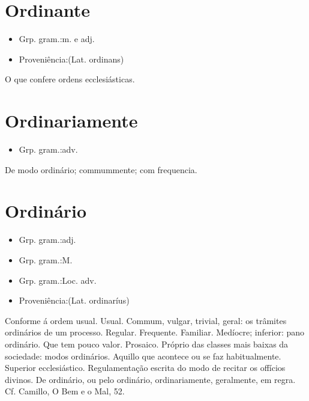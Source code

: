 \section{Ordinante}
\begin{itemize}
\item {Grp. gram.:m.  e  adj.}
\end{itemize}
\begin{itemize}
\item {Proveniência:(Lat. \textunderscore ordinans\textunderscore )}
\end{itemize}
O que confere ordens ecclesiásticas.
\section{Ordinariamente}
\begin{itemize}
\item {Grp. gram.:adv.}
\end{itemize}
De modo ordinário; commummente; com frequencia.
\section{Ordinário}
\begin{itemize}
\item {Grp. gram.:adj.}
\end{itemize}
\begin{itemize}
\item {Grp. gram.:M.}
\end{itemize}
\begin{itemize}
\item {Grp. gram.:Loc. adv.}
\end{itemize}
\begin{itemize}
\item {Proveniência:(Lat. \textunderscore ordinaríus\textunderscore )}
\end{itemize}
Conforme á ordem usual.
Usual.
Commum, vulgar, trivial, geral: \textunderscore os trâmites ordinários de um processo\textunderscore .
Regular.
Frequente.
Familiar.
Medíocre; inferior: \textunderscore pano ordinário\textunderscore .
Que tem pouco valor.
Prosaico.
Próprio das classes mais baixas da sociedade: \textunderscore modos ordinários\textunderscore .
Aquillo que acontece ou se faz habitualmente.
Superior ecclesiástico.
Regulamentação escrita do modo de recitar os offícios divinos.
\textunderscore De ordinário\textunderscore , ou \textunderscore pelo ordinário\textunderscore , ordinariamente, geralmente, em regra. Cf. Camillo, \textunderscore O Bem e o Mal\textunderscore , 52.
